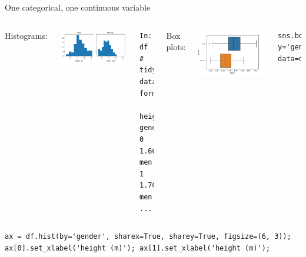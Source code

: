 \documentclass[aspectratio=169,usenames,dvipsnames]{beamer}
\begin{document}
\begin{frame}[fragile]{One categorical, one continuous variable}
    \begin{columns}[T]
            Histograms:

            \includegraphics[width=0.9\linewidth]{fig/contcontheighthist}

\begin{lstlisting}
In: df  # tidy data format!
    height   gender
0   1.667763    men
1   1.709885    men
...
\end{lstlisting}
            Box plots:

            \includegraphics[width=0.9\linewidth]{fig/contcontheightbox}

\begin{lstlisting}
sns.boxplot(x='height', y='gender', data=df)
\end{lstlisting}
    \end{columns}
\begin{lstlisting}
ax = df.hist(by='gender', sharex=True, sharey=True, figsize=(6, 3));
ax[0].set_xlabel('height (m)'); ax[1].set_xlabel('height (m)'); 
\end{lstlisting}
\end{frame}
\end{document}
